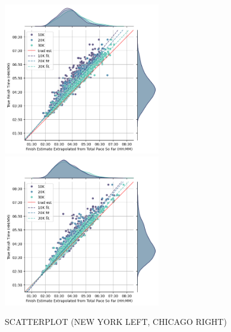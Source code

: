 \documentclass[USenglish,twocolumn]{article}
\theoremstyle{dgthm}
\theoremstyle{dgdef}
\begin{document}
\begin{figure}[ht]
    \centering
    \includegraphics[width=2.7in]{../analysis/plots/nyc_data_scatter.png}
    \includegraphics[width=2.7in]{../analysis/plots/chi_data_scatter.png}
    \caption{SCATTERPLOT (NEW YORK LEFT, CHICAGO RIGHT)}
\end{figure}
\end{document}
